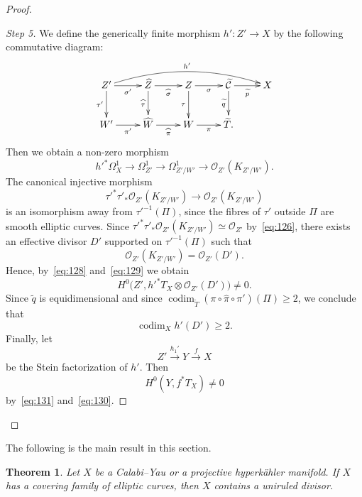 \documentclass[11pt]{article}
\newtheorem{theo}{Theorem}[section]
\theoremstyle{definition}
\newenvironment{proofc}{\begin{proof}}{\end{proof}}
\numberwithin{equation}{section}
\numberwithin{figure}{section}
\numberwithin{table}{section}
\DeclareMathOperator{\codim}{codim}
\newcommand\sC{\mathcal{C}}
\newcommand{\OO}{\mathcal{O}}
\newenvironment{laststep}[1]{\begin{proof}[#1]}{\end{proof}}
\begin{document}
\begin{proofc}
\begin{laststep}{Step 5}
We define the generically finite morphism $h'\colon Z'\to X$ by the following commutative diagram:
\[
\xymatrix{ Z' \ar[d]_-{\tau'} \ar[r]_-{\sigma'} \ar@/^1.2pc/[rrrr]^{h'} & \widehat Z \ar[d]_-{\widehat \tau} \ar[r]_-{\widehat \sigma} & {Z} \ar[d]_-{\tau} \ar[r]_-\sigma & \widetilde{\sC} \ar[d]_-{\widetilde{q}} \ar[r]_-{\widetilde{p}} & X \\
W' \ar[r]_-{\pi'} & \widehat W \ar[r]_-{\widehat \pi} & W \ar[r]_-{\pi} & \widetilde{T}. & }
\]
Then we obtain a non-zero morphism
\begin{equation}\label{eq:128}
h'^*\Omega^1_X \to \Omega^1_{Z'} \to \Omega^1_{Z'/W'} \to \OO_{Z'}(K_{Z'/W'}).
\end{equation}
The canonical injective morphism
\[
\tau'^* \tau'_*\OO_{Z'}(K_{Z'/W'}) \to \OO_{Z'}(K_{Z'/W'})
\]
is an isomorphism away from $\tau'^{-1}(\Pi)$, since the fibres of $\tau'$ outside $\Pi$ are smooth elliptic curves. Since $\tau'^* \tau'_*\OO_{Z'}(K_{Z'/W'}) \simeq \OO_{Z'}$ by~\eqref{eq:126}, there exists an effective divisor $D'$ supported on $ \tau'^{-1}(\Pi)$ such that
\begin{equation}\label{eq:129}
\OO_{Z'}(K_{Z'/W'}) = \OO_{Z'}(D').
\end{equation}
Hence, by~\eqref{eq:128} and~\eqref{eq:129} we obtain
\begin{equation}\label{eq:131}
H^0\big(Z',h'^*T_X \otimes \OO_{Z'}(D')\big) \neq 0.
\end{equation}
Since $\widetilde q$ is equidimensional and since $\codim_{\widetilde{T}} (\pi \circ \widehat \pi \circ \pi')(\Pi) \geq 2$, we conclude that
\begin{equation}\label{eq:130}
\codim_X h'(D') \geq 2.
\end{equation}
Finally, let
\[
Z' \overset{h_1'}{\longrightarrow} Y \overset{f}{\longrightarrow} X
\]
be the Stein factorization of $h'$. Then
\[
H^0(Y, f^*T_X) \neq 0
\]
by~\eqref{eq:131} and~\eqref{eq:130}.
\end{laststep}
\let\qed\relax
\end{proofc}

The following is the main result in this section.

\begin{theo}\label{thm:CYHK}
Let $X$ be a Calabi--Yau or a projective hyperkähler manifold. If $X$ has a covering family of elliptic curves, then $X$ contains a uniruled divisor.
\end{theo}
\end{document}
